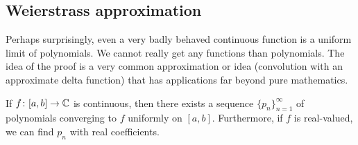 
\subsection{Weierstrass approximation}

Perhaps surprisingly, even a very badly behaved continuous function is
a uniform limit of polynomials.
We cannot really get any 
functions than polynomials.
The idea of the proof is a very common approximation or  idea
(convolution with an approximate delta function) that has applications
far beyond pure mathematics.

\begin{thm}
If $f \colon [a,b] \to {\mathbb{C}}$ is continuous, then there exists a sequence
$\{ p_n \}_{n=1}^\infty$ of polynomials converging to $f$ uniformly on $[a,b]$.
Furthermore, if $f$ is real-valued, we can find $p_n$ with real coefficients.
\end{thm}

